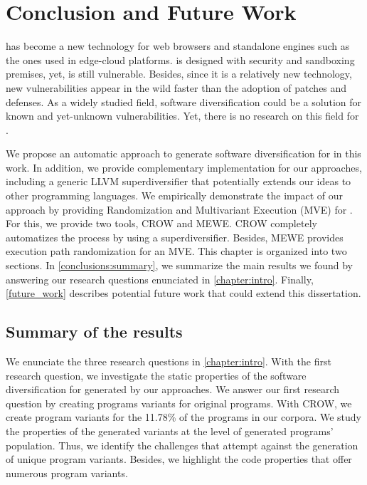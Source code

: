 \chapter{Conclusion and Future Work}
\label{chapter:conclude}

\wasm has become a new technology for web browsers and standalone engines such as the ones used in edge-cloud platforms. \wasm is designed with security and sandboxing premises, yet, is still vulnerable.
Besides, since it is a relatively new technology, new vulnerabilities appear in the wild faster than the adoption of patches and defenses.
As a widely studied field, software diversification could be a solution for known and yet-unknown vulnerabilities. Yet, there is no research on this field for \wasm.

We propose an automatic approach to generate software diversification for \wasm in this work. 
In addition, we provide complementary implementation for our approaches, including a generic LLVM superdiversifier that potentially extends our ideas to other programming languages.
We empirically demonstrate the impact of our approach by providing Randomization and Multivariant Execution (MVE) for \wasm.
For this, we provide two tools, CROW and MEWE. CROW completely automatizes the process by using a superdiversifier. Besides, MEWE provides execution path randomization for an MVE.
This chapter is organized into two sections. 
In \autoref{conclusions:summary}, we summarize the main results we found by answering our research questions enunciated in \autoref{chapter:intro}.
Finally, \autoref{future_work} describes potential future work that could extend this dissertation.

\section{Summary of the results}
\label{conclusions:summary}

We enunciate the three research questions in \autoref{chapter:intro}. 
With the first research question, we investigate the static properties of the software diversification for \wasm generated by our approaches. 
We answer our first research question by creating programs variants for  original programs. 
With CROW, we create program variants for the 11.78\% of the programs in our corpora.
We study the properties of the generated variants at the level of generated programs' population.
Thus, we identify the challenges that attempt against the generation of unique program variants.
Besides, we highlight the code properties that offer numerous program variants. 

